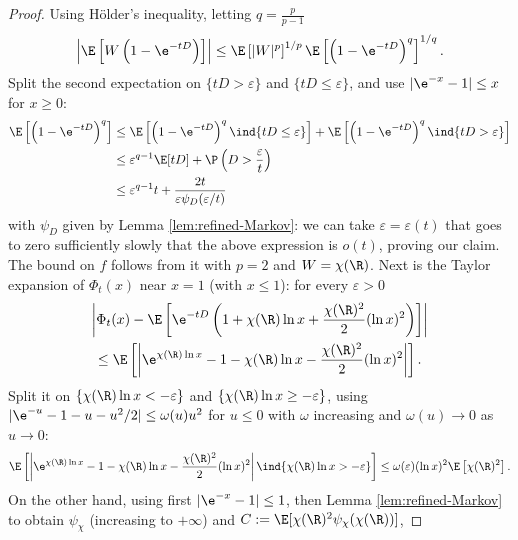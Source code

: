 \documentclass[10pt,a4paper]{article}
\begin{document}


\begin{proof}
Using Hölder's inequality, letting $q = \frac{p}{p-1}$
\[ \left| \E\left[W \left(1 - \e^{-tD}\right)\right]\right| \leq \E\left[|W|^p\right]^{1/p} \E\left[\left(1 - \e^{-tD}\right)^q\right]^{1/q} . \]
Split the second expectation on $\{ tD>\varepsilon\}$ and $\{tD\leq \varepsilon\}$, and use $|\e^{-x}-1|\leq x$ for $x\geq 0$:
\begin{align*}
\E\left[\left(1 - \e^{-tD}\right)^q\right] &\leq  \E\left[\left(1 - \e^{-tD}\right)^q \ind{tD \leq \varepsilon}\right] +  \E\left[\left(1 - \e^{-tD}\right)^q \ind{tD>\varepsilon} \right] \\
&\leq \varepsilon^{q-1} \E[tD] + \P\left( D > \frac{\varepsilon}{t}\right) \\
&\leq \varepsilon^{q-1} t + \frac{2t}{\varepsilon \psi_D(\varepsilon/t)} 
\end{align*}
with $\psi_D$ given by Lemma \ref{lem:refined-Markov}: we can take $\varepsilon = \varepsilon(t)$ that goes to zero sufficiently slowly that the above expression is $o(t)$, proving our claim. The bound on $f$ follows from it with $p=2$ and $W = \chi(\R)$. Next is the Taylor expansion of $\Phi_t(x)$ near $x=1$ (with $x\leq 1$): for every $\varepsilon>0$
\begin{multline*}
\left| \Phi_t(x) - \E\left[ \e^{-tD}\left( 1 + \chi(\R) \ln x + \frac{\chi(\R)^2}{2} (\ln x)^2 \right) \right] \right| \\
\leq \E\left[ \left| \e^{\chi(\R)\ln x} - 1 - \chi(\R) \ln x - \frac{\chi(\R)^2}{2} (\ln x)^2 \right| \right] .
\end{multline*}
Split it on $\{ \chi(\R)\ln x < -\varepsilon\}$ and $\{\chi(\R)\ln x \geq -\varepsilon\}$, using $|\e^{-u} - 1 - u - u^2/2| \leq \omega(u) u^2$ for $u\leq 0$ with $\omega$ increasing and $\omega(u) \to 0$ as $u\to 0$:
\begin{equation}\label{eq:lem-phit-taylor-exp-1}
\E\left[ \left| \e^{\chi(\R)\ln x} - 1 - \chi(\R) \ln x - \frac{\chi(\R)^2}{2} (\ln x)^2 \right| \ind{\chi(\R)\ln x > -\varepsilon} \right] \leq \omega(\varepsilon) (\ln x)^2 \E\left[ \chi(\R)^2 \right] .
\end{equation}
On the other hand, using first $|\e^{-x}-1| \leq 1$, then Lemma \ref{lem:refined-Markov} to obtain $\psi_\chi$ (increasing to $+\infty$) and $C := \E[\chi(\R)^2 \psi_\chi(\chi(\R))]$,

\end{proof}
\end{document}

